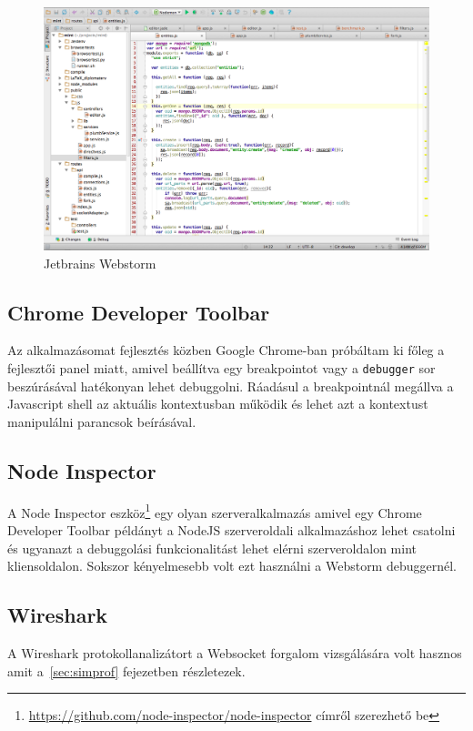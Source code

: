 \begin{figure}[!ht]
\centering
\includegraphics[width=15cm,keepaspectratio]{figures/webstorm.png}
\caption{Jetbrains Webstorm}
\label{fig:webstorm}
\end{figure}

\subsection{Chrome Developer Toolbar}

Az alkalmazásomat fejlesztés közben Google Chrome-ban próbáltam ki főleg a fejlesztői panel miatt, amivel beállítva egy breakpointot vagy a \lstinline{debugger} sor beszúrásával hatékonyan lehet debuggolni. Ráadásul a breakpointnál megállva a Javascript shell az aktuális kontextusban működik és lehet azt a kontextust manipulálni parancsok beírásával.


\subsection{Node Inspector}

A Node Inspector eszköz\footnote{ \url{https://github.com/node-inspector/node-inspector} címről szerezhető be} egy olyan szerveralkalmazás amivel egy Chrome Developer Toolbar példányt a NodeJS szerveroldali alkalmazáshoz lehet csatolni és ugyanazt a debuggolási funkcionalitást lehet elérni szerveroldalon mint kliensoldalon. Sokszor kényelmesebb volt ezt használni a Webstorm debuggernél.

\subsection{Wireshark}

A Wireshark protokollanalizátort a Websocket forgalom vizsgálására volt hasznos amit a~\ref{sec:simprof} fejezetben részletezek.

